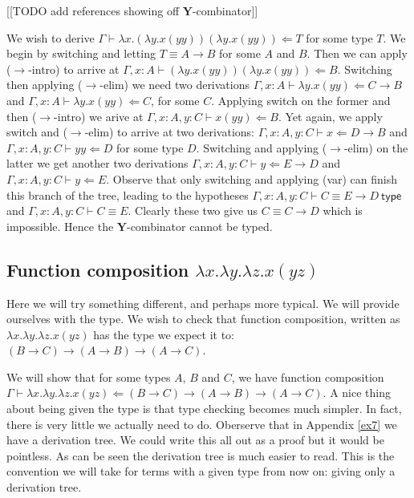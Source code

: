 [[TODO add references showing off $\mathbf{Y}$-combinator]]

\begin{example}\label{y_comb}
    We wish to derive $\Gamma \vdash \lambda x . (\lambda y . x( y y)) (\lambda y . x (y y)) \Leftarrow T$ for some type $T$. We begin by switching and letting $T \equiv A \to B$ for some $A$ and $B$. Then we can apply ($\to$-intro) to arrive at $\Gamma , x : A \vdash (\lambda y . x (y y))(\lambda y . x (yy) ) \Leftarrow B$. Switching then applying ($\to$-elim) we need two derivations $\Gamma , x : A \vdash \lambda y . x (y y) \Leftarrow C \to B$ and $\Gamma , x : A \vdash \lambda y . x (y y) \Leftarrow C$, for some $C$. Applying switch on the former and then ($\to$-intro) we arive at $\Gamma , x : A, y : C \vdash x ( y y) \Leftarrow B$. Yet again, we apply switch and ($\to$-elim) to arrive at two derivations: $\Gamma, x : A, y : C \vdash x \Leftarrow D \to B$ and $\Gamma , x : A, y : C \vdash y y \Leftarrow D$ for some type $D$. Switching and applying ($\to$-elim) on the latter we get another two derivations $\Gamma , x : A, y : C \vdash y \Leftarrow E \to D$ and $\Gamma , x : A, y : C \vdash y \Leftarrow E$. Observe that only switching and applying (var) can finish this branch of the tree, leading to the hypotheses $\Gamma , x : A, y : C \vdash C \equiv E \to D \ \mathsf{type}$ and $\Gamma , x : A, y : C \vdash C \equiv E$. Clearly these two give us $C \equiv C \to D$ which is impossible. Hence the $\mathbf{Y}$-combinator cannot be typed. 
\end{example}


\subsection{Function composition \texorpdfstring{$\lambda x . \lambda y . \lambda z . x ( y z)$}{}} %

Here we will try something different, and perhaps more typical. We will provide ourselves with the type. We wish to check that function composition, written as $\lambda x.\lambda y.\lambda z.x(yz)$ has the type we expect it to: $(B \to C) \to (A \to B) \to (A \to C)$.

\begin{example}\label{function_comp}
    We will show that for some types $A$, $B$ and $C$, we have function composition $\Gamma \vdash \lambda x.\lambda y.\lambda z.x(yz) \Leftarrow (B \to C) \to (A \to B) \to (A \to C)$.
    A nice thing about being given the type is that type checking becomes much simpler. In fact, there is very little we actually need to do. Oberserve that in Appendix \ref{ex7} we have a derivation tree. We could write this all out as a proof but it would be pointless. As can be seen the derivation tree is much easier to read.
    This is the convention we will take for terms with a given type from now on: giving only a derivation tree.
    
\end{example}



